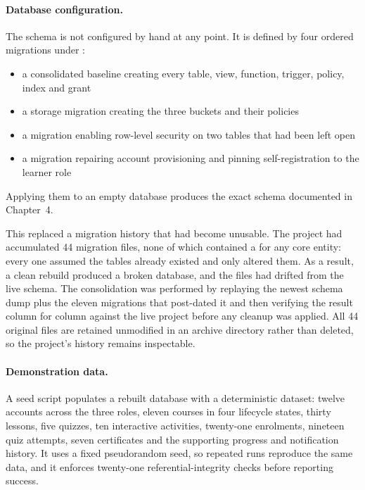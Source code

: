\documentclass[12pt, oneside]{article} %
\newcommand{\tcode}[1]{\path{#1}}
\begin{document}
\paragraph{Database configuration.} The schema is not configured by hand at any point. It is defined by four ordered migrations under \tcode{supabase/migrations/}:

\begin{itemize}
    \item a consolidated baseline creating every table, view, function, trigger, policy, index and grant
    \item a storage migration creating the three buckets and their policies
    \item a migration enabling row-level security on two tables that had been left open
    \item a migration repairing account provisioning and pinning self-registration to the learner role
\end{itemize}

Applying them to an empty database produces the exact schema documented in Chapter~4.

This replaced a migration history that had become unusable. The project had accumulated 44 migration files, none of which contained a \tcode{CREATE TABLE} for any core entity: every one assumed the tables already existed and only altered them. As a result, a clean rebuild produced a broken database, and the files had drifted from the live schema. The consolidation was performed by replaying the newest schema dump plus the eleven migrations that post-dated it and then verifying the result column for column against the live project before any cleanup was applied. All 44 original files are retained unmodified in an archive directory rather than deleted, so the project's history remains inspectable.

\paragraph{Demonstration data.} A seed script populates a rebuilt database with a deterministic dataset: twelve accounts across the three roles, eleven courses in four lifecycle states, thirty lessons, five quizzes, ten interactive activities, twenty-one enrolments, nineteen quiz attempts, seven certificates and the supporting progress and notification history. It uses a fixed pseudorandom seed, so repeated runs reproduce the same data, and it enforces twenty-one referential-integrity checks before reporting success.
\end{document}

